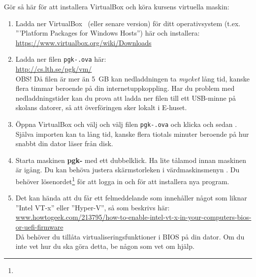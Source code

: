 Gör så här för att installera VirtualBox och köra kursens virtuella maskin:
\begin{enumerate}
\item  Ladda ner VirtualBox \VirtualBoxVersion~(eller senare version) för ditt operativsystem (t.ex. '''Platform Packages for Windows Hosts'') här och installera: \\ \url{https://www.virtualbox.org/wiki/Downloads}


\item     Ladda ner filen \texttt{pgk-\VMName.ova} här: \\ \url{http://cs.lth.se/pgk/vm/} \\ OBS! Då filen är mer än 5~GB kan nedladdningen ta \textit{mycket} lång tid, kanske flera timmar beroende på din internetuppkoppling. Har du problem med nedladdningstider kan du prova att ladda ner filen till ett USB-minne på skolans datorer, så att överföringen sker lokalt i E-huset.

\item     Öppna VirtualBox och välj  och välj filen \texttt{pgk-\VMName.ova} och klicka  och sedan . Själva importen kan ta lång tid, kanske flera tiotals minuter beroende på hur snabbt din dator läser från disk.

\item Starta maskinen \textbf{pgk-\VMName} med ett dubbelklick. Ha lite tålamod innan maskinen är igång. Du kan behöva justera skärmstorleken i värdmaskinsmenyn . Du  behöver lösenordet\footnote{} för att logga in och för att installera nya program. 

\item Det kan hända att du får ett felmeddelande som innehåller något som liknar ''Intel VT-x'' eller ''Hyper-V'', så som beskrivs här:
\\ \href{http://www.howtogeek.com/213795/how-to-enable-intel-vt-x-in-your-computers-bios-or-uefi-firmware/}{www.howtogeek.com/213795/how-to-enable-intel-vt-x-in-your-computers-bios-or-uefi-firmware}\\
Då behöver du tillåta virtualiseringsfunktioner i BIOS på din dator. Om du inte vet hur du ska göra detta, be någon som vet om hjälp.


\end{enumerate}
